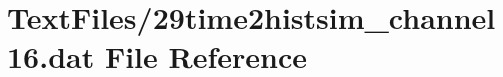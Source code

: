 \hypertarget{29time2histsim__channel16_8dat}{}\section{Text\+Files/29time2histsim\+\_\+channel16.dat File Reference}
\label{29time2histsim__channel16_8dat}
